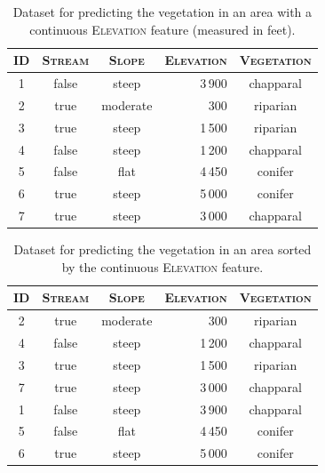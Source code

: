 \documentclass[xcolor={table}]{beamer}
\newcommand{\featN}[1]{\textsc{#1}}
\begin{document}
 \begin{frame} 
\begin{table}[h]
\caption{Dataset for predicting the vegetation in an area with a continuous \featN{Elevation} feature (measured in feet).}
\label{tab:ecologydatanumeric}
\centering
\begin{footnotesize}
\begin{tabular}{c c c r c }
\hline
\featN{ID}	 & \featN{Stream}	& \featN{Slope} & \featN{Elevation} & \featN{Vegetation}\\
\hline
1 & false & steep & 3\,900 & chapparal\\
2 & true & moderate & 300 & riparian\\
3 & true & steep & 1\,500 & riparian\\
4 & false & steep & 1\,200 & chapparal\\
5 & false & flat & 4\,450 & conifer\\
6 & true & steep & 5\,000 & conifer\\
7 & true & steep & 3\,000 & chapparal\\
\hline
\end{tabular}
\end{footnotesize}
\end{table}
\end{frame} 



 \begin{frame} 
\begin{table}[h]
\caption{Dataset for predicting the vegetation in an area sorted by the continuous \featN{Elevation} feature.}
\label{tab:ecologydatanumericsorted}
\centering
\begin{footnotesize}
\begin{tabular}{c c c r c }
\hline
\featN{ID}	 & \featN{Stream}	& \featN{Slope} & \featN{Elevation} & \featN{Vegetation}\\
\hline
2 & true & moderate & 300 & riparian\\
4 & false & steep & 1\,200 & chapparal\\
3 & true & steep & 1\,500 & riparian\\
7 & true & steep & 3\,000 & chapparal\\
1 & false & steep & 3\,900 & chapparal\\
5 & false & flat & 4\,450 & conifer\\
6 & true & steep & 5\,000 & conifer\\
\hline
\end{tabular}
\end{footnotesize}
\end{table}
\end{frame} 
\end{document}
